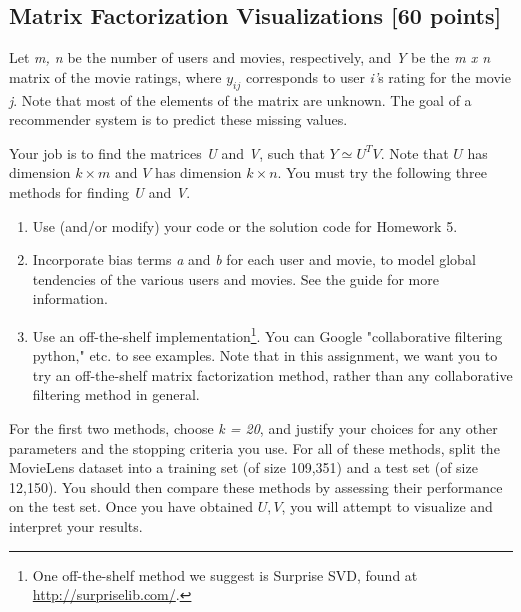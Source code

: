 \subsection{Matrix Factorization Visualizations [60 points]}
Let \textit{m, n} be the number of users and movies, respectively, and \textit{Y} be the \textit{m x n} matrix of the movie ratings, where $y_{ij}$ corresponds to user \textit{i'}s rating for the movie \textit{j}. Note that most of the elements of the matrix are unknown. The goal of a recommender system is to predict these missing values.

Your job is to find the matrices \textit{U} and \textit{V}, such that ${Y}\simeq{U^TV}$. Note that $U$ has dimension $k \times m$ and $V$ has dimension $k \times n$. You must try the following three methods for finding \textit{U} and \textit{V}.

\begin{enumerate}
	\item Use (and/or modify) your code or the solution code for Homework 5.
	\item Incorporate bias terms \textit{a} and \textit{b} for each user and movie, to model global tendencies of the various users and movies. See the guide for more information.
	\item Use an off-the-shelf implementation\footnote{One off-the-shelf method we suggest is Surprise SVD, found at \url{http://surpriselib.com/}.}. You can Google "collaborative filtering python,"  etc. to see examples. Note that in this assignment, we want you to try an off-the-shelf matrix factorization method, rather than any collaborative filtering method in general.
\end{enumerate}

For the first two methods, choose \textit{k = 20}, and justify your choices for any other parameters and the stopping criteria you use. For all of these methods, split the MovieLens dataset into a training set (of size 109,351) and a test set (of size 12,150). You should then compare these methods by assessing their performance on the test set. Once you have obtained $U,V$, you will attempt to visualize and interpret your results.

